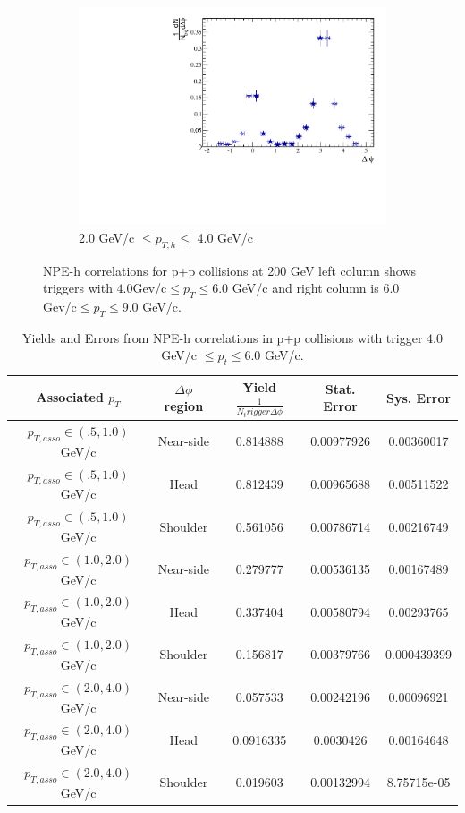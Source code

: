 \begin{figure}[htbp]
\begin{subfigure}{0.5\textwidth}
		\includegraphics[width=.9\textwidth]{Plots/Correlations/pp/pp_NPE_h_corr_primpt_6_8_assopt_3_4.pdf}
		\caption{2.0 GeV/c $\leq p_{T,h} \leq$ 4.0 GeV/c}
		\label{fig:ppcorrf}
	\end{subfigure}	
\caption[NPE-hadron correlations in p+p]{NPE-h correlations for p+p collisions at 200 GeV left column shows triggers with $4.0 $Gev/c$\leq p_{T} \leq 6.0$ GeV/c and right column is $6.0 $Gev/c$\leq p_{T} \leq 9.0$ GeV/c.}
\label{fig:ppcorr}
\end{figure}


\begin{table}
\centering
\begin{tabular}{|c|c|c|c|c|}
\hline
Associated $p_T$	& $\Delta\phi$ region & Yield $\frac{1}{N_trigger \Delta\phi}$ & Stat. Error & Sys. Error\\
\hline
$p_{T,asso} \in(.5, 1.0)$ GeV/c  & Near-side  &  0.814888 & 0.00977926 & 0.00360017 \\
\hline
$p_{T,asso} \in(.5, 1.0)$ GeV/c  & Head  &  0.812439 & 0.00965688 & 0.00511522 \\
\hline
$p_{T,asso} \in(.5, 1.0)$ GeV/c  & Shoulder & 0.561056 & 0.00786714 & 0.00216749\\ 
\hline
$p_{T,asso} \in(1.0, 2.0)$ GeV/c  & Near-side & 0.279777 & 0.00536135 & 0.00167489 \\ 
\hline
$p_{T,asso} \in(1.0, 2.0)$ GeV/c  & Head & 0.337404 & 0.00580794 & 0.00293765 \\
\hline
$p_{T,asso} \in(1.0, 2.0)$ GeV/c  & Shoulder & 0.156817 & 0.00379766 & 0.000439399 \\ 
\hline
$p_{T,asso} \in(2.0, 4.0)$ GeV/c  & Near-side & 0.057533 & 0.00242196 & 0.00096921 \\
\hline
$p_{T,asso} \in(2.0, 4.0)$ GeV/c  & Head & 0.0916335 & 0.0030426 & 0.00164648 \\
\hline
$p_{T,asso} \in(2.0, 4.0)$ GeV/c  & Shoulder & 0.019603 & 0.00132994 & 8.75715e-05 \\
\hline
\end{tabular}
\caption[Yields and Errors in p+p Correlations, Low Trigger]{Yields and Errors from NPE-h correlations in p+p collisions with trigger $4.0 $GeV/c $\leq p_t \leq 6.0$ GeV/c.}
\label{tab:ppyieldlow}
\end{table} 

